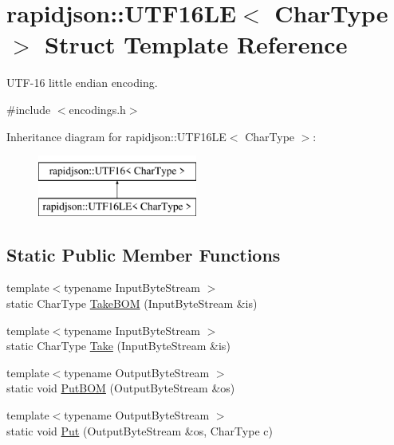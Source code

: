 \hypertarget{structrapidjson_1_1_u_t_f16_l_e}{}\section{rapidjson\+::U\+T\+F16\+LE$<$ Char\+Type $>$ Struct Template Reference}
\label{structrapidjson_1_1_u_t_f16_l_e}


U\+T\+F-\/16 little endian encoding.  




{\ttfamily \#include $<$encodings.\+h$>$}

Inheritance diagram for rapidjson\+::U\+T\+F16\+LE$<$ Char\+Type $>$\+:\begin{figure}[H]
\begin{center}
\leavevmode
\includegraphics[height=2.000000cm]{structrapidjson_1_1_u_t_f16_l_e}
\end{center}
\end{figure}
\subsection*{Static Public Member Functions}
\begin{DoxyCompactItemize}
\item 
{\footnotesize template$<$typename Input\+Byte\+Stream $>$ }\\static Char\+Type \mbox{\hyperlink{structrapidjson_1_1_u_t_f16_l_e_a4d3a271692803a71bc26f004e0505c18}{Take\+B\+OM}} (Input\+Byte\+Stream \&is)
\item 
{\footnotesize template$<$typename Input\+Byte\+Stream $>$ }\\static Char\+Type \mbox{\hyperlink{structrapidjson_1_1_u_t_f16_l_e_afae56fc8dfd1bf27b27608ee41415d8c}{Take}} (Input\+Byte\+Stream \&is)
\item 
{\footnotesize template$<$typename Output\+Byte\+Stream $>$ }\\static void \mbox{\hyperlink{structrapidjson_1_1_u_t_f16_l_e_a56d0c0242802d60e74ecc38b5843cdc6}{Put\+B\+OM}} (Output\+Byte\+Stream \&os)
\item 
{\footnotesize template$<$typename Output\+Byte\+Stream $>$ }\\static void \mbox{\hyperlink{structrapidjson_1_1_u_t_f16_l_e_ae3ecd38c70fe23a0a5d8a31866cf9228}{Put}} (Output\+Byte\+Stream \&os, Char\+Type c)
\end{DoxyCompactItemize}
